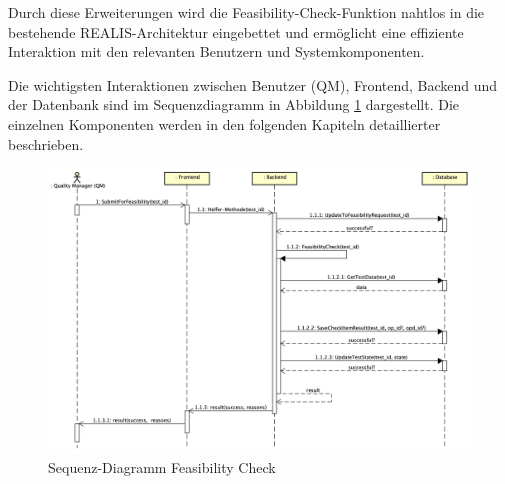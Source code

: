 Durch diese Erweiterungen wird die Feasibility-Check-Funktion nahtlos in die bestehende REALIS-Architektur eingebettet und ermöglicht eine effiziente Interaktion mit den relevanten Benutzern und Systemkomponenten.

Die wichtigsten Interaktionen zwischen Benutzer (\gls{QM}), Frontend, Backend und der Datenbank sind im Sequenzdiagramm in Abbildung \ref{fig:sequence-diagram} dargestellt. Die einzelnen Komponenten werden in den folgenden Kapiteln detaillierter beschrieben. 

\begin{figure}[!htbp]
    \centering
    \includegraphics[width=1\textwidth]{bilder/Feasibility-Sequenz-Diagramm.png}
    \caption{Sequenz-Diagramm Feasibility Check}
    \label{fig:sequence-diagram}
\end{figure}


